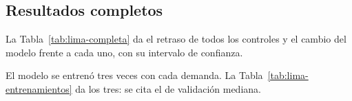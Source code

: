 \subsection*{Resultados completos}

La Tabla~\ref{tab:lima-completa} da el retraso de todos los controles y
el cambio del modelo frente a cada uno, con su intervalo de confianza.

\begin{table}[!tbp]
\centering
\footnotesize
\setlength{\tabcolsep}{3pt}

\caption[Caso Lima: todos los controles]{Caso Lima: retraso total por vehículo de cada control en las dos tandas de evaluación, de 100 semillas cada una, y cambio del modelo completo frente a cada control (\%), con su IC95 y el valor $p$ de la prueba de Wilcoxon pareada. Un cambio negativo es menos retraso con el modelo.}
\label{tab:lima-completa}
\end{table}

El modelo se entrenó tres veces con cada demanda. La
Tabla~\ref{tab:lima-entrenamientos} da los tres: se cita el de
validación mediana.

\begin{table}[!tbp]
\centering
\footnotesize
\setlength{\tabcolsep}{3pt}

\caption[Caso Lima: los tres entrenamientos del modelo]{Caso Lima: los tres entrenamientos del modelo completo con cada nivel de demanda. La versión evaluada de cada uno es la de menor retraso total en las ocho semillas de validación; el entrenamiento citado es el de validación mediana entre los tres.}
\label{tab:lima-entrenamientos}
\end{table}
